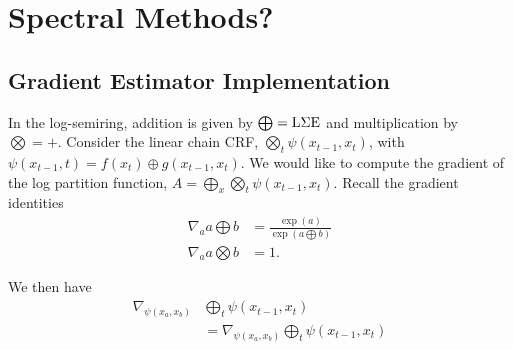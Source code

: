 \documentclass{article}
\begin{document}
\section{Spectral Methods?}




\begin{appendix}
\section{Gradient Estimator Implementation}
In the log-semiring, addition is given by $\bigoplus = \LSE$ and multiplication
by $\bigotimes = +$.
Consider the linear chain CRF, $\bigotimes_t \psi(x_{t-1}, x_t)$,
with $\psi(x_{t-1}, t) = f(x_t) \oplus g(x_{t-1},x_t)$.
We would like to compute the gradient of the
log partition function, $A = \bigoplus_x \bigotimes_t \psi(x_{t-1}, x_t)$.
Recall the gradient identities 
\begin{equation}
\begin{aligned}
\nabla_a a \bigoplus b &= \frac{\exp(a)}{\exp(a \bigoplus b)}\\
\nabla_a a \bigotimes b &= 1.
\end{aligned}
\end{equation}

We then have 
\begin{equation}
\begin{aligned}
\nabla_{\psi(x_a,x_b)} &\bigoplus_t \psi(x_{t-1}, x_t)\\
&= \nabla_{\psi(x_a,x_b)} \bigoplus_t \psi(x_{t-1}, x_t)\\
\end{aligned}
\end{equation}


\end{appendix}
\end{document}

